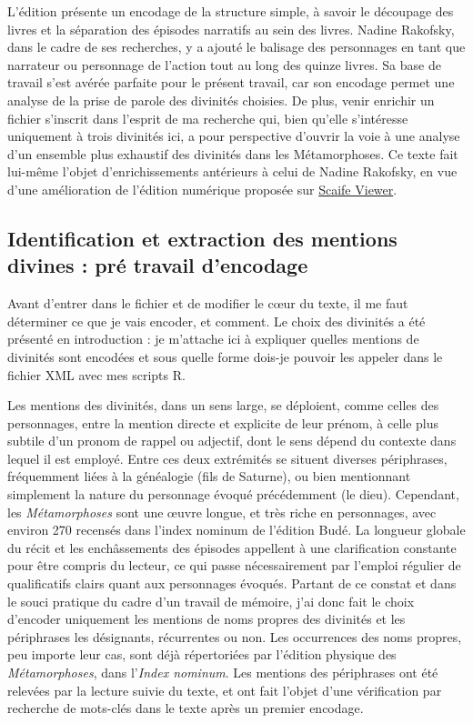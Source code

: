 \documentclass[
  letterpaper,
  DIV=11,
  numbers=noendperiod]{scrreprt}
\begin{document}
L'édition présente un encodage de la structure simple, à savoir le
découpage des livres et la séparation des épisodes narratifs au sein des
livres. Nadine Rakofsky, dans le cadre de ses recherches, y a ajouté le
balisage des personnages en tant que narrateur ou personnage de l'action
tout au long des quinze livres. Sa base de travail s'est avérée parfaite
pour le présent travail, car son encodage permet une analyse de la prise
de parole des divinités choisies. De plus, venir enrichir un fichier
s'inscrit dans l'esprit de ma recherche qui, bien qu'elle s'intéresse
uniquement à trois divinités ici, a pour perspective d'ouvrir la voie à
une analyse d'un ensemble plus exhaustif des divinités dans les
Métamorphoses. Ce texte fait lui-même l'objet d'enrichissements
antérieurs à celui de Nadine Rakofsky, en vue d'une amélioration de
l'édition numérique proposée sur
\href{https://scaife.perseus.org/}{Scaife Viewer}.

\subsection{Identification et extraction des mentions divines : pré
travail
d'encodage}\label{identification-et-extraction-des-mentions-divines-pruxe9-travail-dencodage}

Avant d'entrer dans le fichier et de modifier le cœur du texte, il me
faut déterminer ce que je vais encoder, et comment. Le choix des
divinités a été présenté en introduction : je m'attache ici à expliquer
quelles mentions de divinités sont encodées et sous quelle forme dois-je
pouvoir les appeler dans le fichier XML avec mes scripts R.

Les mentions des divinités, dans un sens large, se déploient, comme
celles des personnages, entre la mention directe et explicite de leur
prénom, à celle plus subtile d'un pronom de rappel ou adjectif, dont le
sens dépend du contexte dans lequel il est employé. Entre ces deux
extrémités se situent diverses périphrases, fréquemment liées à la
généalogie (fils de Saturne), ou bien mentionnant simplement la nature
du personnage évoqué précédemment (le dieu). Cependant, les
\emph{Métamorphoses} sont une œuvre longue, et très riche en
personnages, avec environ 270 recensés dans l'index nominum de l'édition
Budé. La longueur globale du récit et les enchâssements des épisodes
appellent à une clarification constante pour être compris du lecteur, ce
qui passe nécessairement par l'emploi régulier de qualificatifs clairs
quant aux personnages évoqués. Partant de ce constat et dans le souci
pratique du cadre d'un travail de mémoire, j'ai donc fait le choix
d'encoder uniquement les mentions de noms propres des divinités et les
périphrases les désignants, récurrentes ou non. Les occurrences des noms
propres, peu importe leur cas, sont déjà répertoriées par l'édition
physique des \emph{Métamorphoses}, dans l'\emph{Index nominum}. Les
mentions des périphrases ont été relevées par la lecture suivie du
texte, et ont fait l'objet d'une vérification par recherche de mots-clés
dans le texte après un premier encodage.
\end{document}
